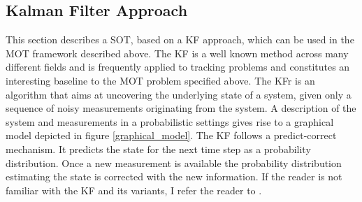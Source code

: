 \documentclass[12pt,a4paper]{article}
\begin{document}
\subsection{Kalman Filter Approach}
\label{kf_appraoch}
This section describes a SOT, based on a KF approach, which can be used in the MOT framework described above. The KF is a well known method across many different fields and is frequently applied to tracking problems and constitutes an interesting baseline to the MOT problem specified above. The KFr is an algorithm that aims at uncovering the underlying state of a system, given only a sequence of noisy measurements originating from the system. A description of the system and measurements in a probabilistic settings gives rise to a graphical model depicted in figure \ref{graphical_model}. The KF follows a predict-correct mechanism. It predicts the state for the next time step as a probability distribution. Once a new measurement is available the probability distribution estimating the state is corrected with the new information. If the reader is not familiar with the KF and its variants, I refer the reader to \cite[Chapter~19]{prince}.\\
\end{document}
